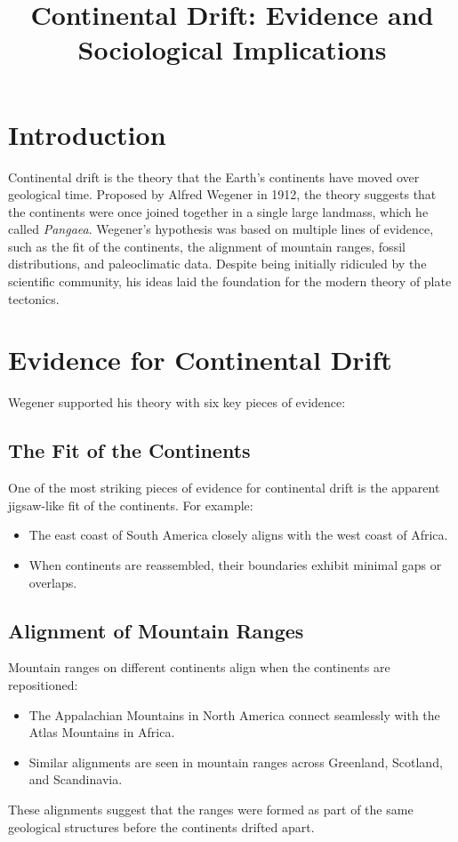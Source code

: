 \documentclass{article}
\begin{document}
\title{Continental Drift: Evidence and Sociological Implications}
\author{}
\date{}

\maketitle

\section*{Introduction}

Continental drift is the theory that the Earth's continents have moved over geological time. Proposed by Alfred Wegener in 1912, the theory suggests that the continents were once joined together in a single large landmass, which he called \emph{Pangaea}. Wegener's hypothesis was based on multiple lines of evidence, such as the fit of the continents, the alignment of mountain ranges, fossil distributions, and paleoclimatic data. Despite being initially ridiculed by the scientific community, his ideas laid the foundation for the modern theory of plate tectonics.

\section{Evidence for Continental Drift}

Wegener supported his theory with six key pieces of evidence:

\subsection{The Fit of the Continents}

One of the most striking pieces of evidence for continental drift is the apparent jigsaw-like fit of the continents. For example:
\begin{itemize}
    \item The east coast of South America closely aligns with the west coast of Africa.
    \item When continents are reassembled, their boundaries exhibit minimal gaps or overlaps.
\end{itemize}

\subsection{Alignment of Mountain Ranges}

Mountain ranges on different continents align when the continents are repositioned:
\begin{itemize}
    \item The Appalachian Mountains in North America connect seamlessly with the Atlas Mountains in Africa.
    \item Similar alignments are seen in mountain ranges across Greenland, Scotland, and Scandinavia.
\end{itemize}
These alignments suggest that the ranges were formed as part of the same geological structures before the continents drifted apart.
\end{document}
